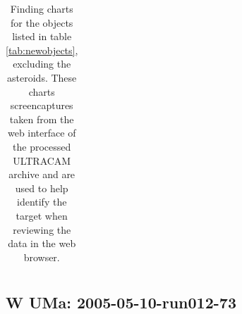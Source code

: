 \begin{table}
\begin{tabular}{ccc}
   \\
  \end{tabular}
  \caption{Finding charts for the objects listed in table \ref{tab:newobjects}, excluding the asteroids. These charts screencaptures taken from the web interface of the processed ULTRACAM archive and are used to help identify the target when reviewing the data in the web browser.}
  \label{tab:findingcharts}
\end{table}

\newpage

\subsection{{W UMa}: 2005-05-10-run012-73}
  
